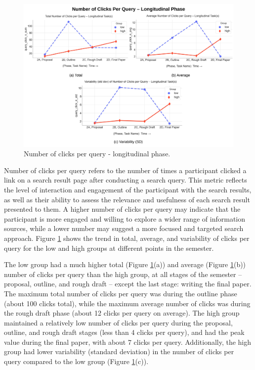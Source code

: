 \documentclass[letterpaper, nobind]{templates/ociamthesis}
\begin{document}
\begin{figure}

{\centering \includegraphics[width=1\linewidth]{figs/rp2-query-click} 

}

\caption[Number of clicks per query - longitudinal phase.]{Number of clicks per query - longitudinal phase.}\label{fig:rp2-query-click}
\end{figure}





Number of clicks per query refers to the number of times a participant clicked a link on a search result page after conducting a search query.
This metric reflects the level of interaction and engagement of the participant with the search results, as well as their ability to assess the relevance and usefulness of each search result presented to them.
A higher number of clicks per query may indicate that the participant is more engaged and willing to explore a wider range of information sources, while a lower number may suggest a more focused and targeted search approach.
Figure \ref{fig:rp2-query-click} shows the trend in total, average, and variability of clicks per query for the low and high groups at different points in the semester.

The low group had a much higher total (Figure \ref{fig:rp2-query-click}(a)) and average (Figure \ref{fig:rp2-query-click}(b)) number of clicks per query than the high group, at all stages of the semester -- proposal, outline, and rough draft -- except the last stage: writing the final paper.
The maximum total number of clicks per query was during the outline phase (about 100 clicks total), while the maximum average number of clicks was during the rough draft phase (about 12 clicks per query on average).
The high group maintained a relatively low number of clicks per query during the proposal, outline, and rough draft stages (less than 4 clicks per query), and had the peak value during the final paper, with about 7 clicks per query.
Additionally, the high group had lower variability (standard deviation) in the number of clicks per query compared to the low group (Figure \ref{fig:rp2-query-click}(c)).
\end{document}
